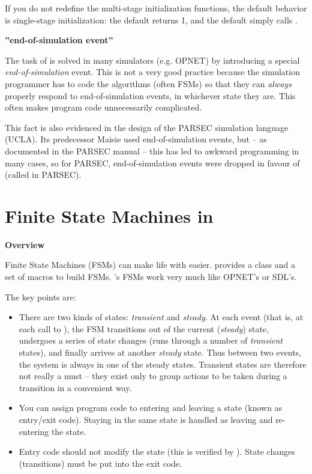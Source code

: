 If you do not redefine the multi-stage initialization functions, the
default behavior is single-stage initialization: the default
 returns 1, and the default  simply calls .


\textbf{''end-of-simulation event''}


The task of  is solved in many simulators (e.g. OPNET)
by introducing a special
\textit{end-of-simulation} event. This is not
a very good practice because the simulation programmer has to code the
algorithms (often FSMs) so that they can \textit{always} properly
respond to end-of-simulation events, in whichever state they are. This
often makes program code unnecessarily complicated.

This fact is also evidenced in the design of the PARSEC
simulation language (UCLA). Its predecessor Maisie used
end-of-simulation events, but -- as documented in the PARSEC manual --
this has led to awkward programming in many cases, so for PARSEC,
end-of-simulation events were dropped in favour of 
(called  in PARSEC).





\section{Finite State Machines in {\opp}}

\textbf{Overview}


Finite State Machines (FSMs)
can make life with  easier. {\opp} provides a
class and a set of macros to build FSMs. {\opp}'s FSMs work very much
like OPNET's or SDL's.


The key points are:
\begin{itemize}
\item{There are two kinds of states:
    \textit{transient} and
    \textit{steady}. At each event (that is, at
    each call to ), the FSM transitions out of
    the current (\textit{steady}) state, undergoes a series of state
    changes (runs through a number of \textit{transient} states), and
    finally arrives at another \textit{steady} state. Thus between two
    events, the system is always in one of the steady states.
    Transient states are therefore not really a must -- they exist
    only to group actions to be taken during a transition in a
    convenient way.}
\item{You can assign program code to entering and leaving a state
    (known as entry/exit code).
    Staying in the same state is handled as leaving and re-entering
    the state.}
\item{Entry code should not modify the state (this is verified by
    {\opp}).  State changes (transitions) must be put into the exit
    code.}
\end{itemize}

